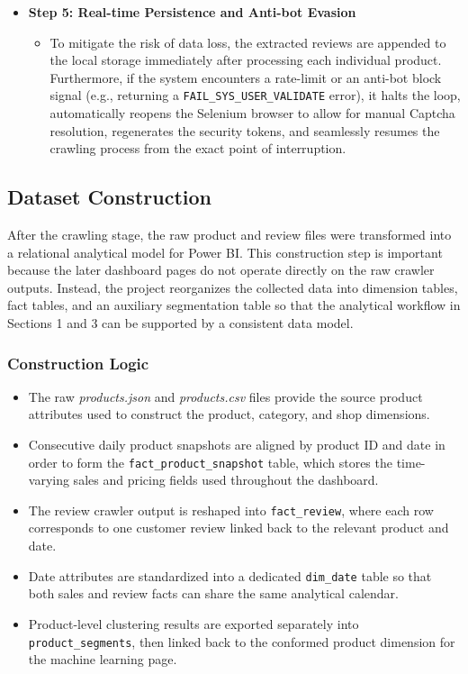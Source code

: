 \begin{itemize}
            \item \textbf{Step 5: Real-time Persistence and Anti-bot Evasion}
            \begin{itemize}
                \item To mitigate the risk of data loss, the extracted reviews are appended to the local storage immediately after processing each individual product. Furthermore, if the system encounters a rate-limit or an anti-bot block signal (e.g., returning a \texttt{FAIL\_SYS\_USER\_VALIDATE} error), it halts the loop, automatically reopens the Selenium browser to allow for manual Captcha resolution, regenerates the security tokens, and seamlessly resumes the crawling process from the exact point of interruption.
            \end{itemize}
        \end{itemize}

    \subsection{Dataset Construction}
    After the crawling stage, the raw product and review files were transformed into a relational analytical model for Power BI. This construction step is important because the later dashboard pages do not operate directly on the raw crawler outputs. Instead, the project reorganizes the collected data into dimension tables, fact tables, and an auxiliary segmentation table so that the analytical workflow in Sections 1 and 3 can be supported by a consistent data model.

        \subsubsection{Construction Logic}
        \begin{itemize}
            \item The raw \textit{products.json} and \textit{products.csv} files provide the source product attributes used to construct the product, category, and shop dimensions.
            \item Consecutive daily product snapshots are aligned by product ID and date in order to form the \texttt{fact\_product\_snapshot} table, which stores the time-varying sales and pricing fields used throughout the dashboard.
            \item The review crawler output is reshaped into \texttt{fact\_review}, where each row corresponds to one customer review linked back to the relevant product and date.
            \item Date attributes are standardized into a dedicated \texttt{dim\_date} table so that both sales and review facts can share the same analytical calendar.
            \item Product-level clustering results are exported separately into \texttt{product\_segments}, then linked back to the conformed product dimension for the machine learning page.
        \end{itemize}

